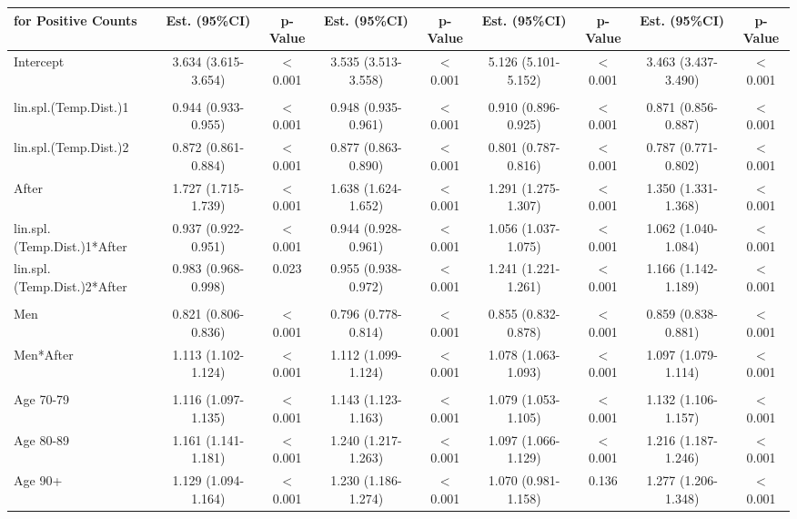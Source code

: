 \begin{landscape}
\begin{table}[H]
\begin{tabular}{lcccccccc}
    \textbf{for Positive Counts} & \textbf{Est. (95\%CI)} & \textbf{p-Value} & \textbf{Est. (95\%CI)} & \textbf{p-Value} & \textbf{Est. (95\%CI)} & \textbf{p-Value} & \textbf{Est. (95\%CI)} & \textbf{p-Value} \\
    \midrule
    Intercept & 3.634 (3.615-3.654) & $<$0.001 & 3.535 (3.513-3.558) & $<$0.001 & 5.126 (5.101-5.152) & $<$0.001 & 3.463 (3.437-3.490) & $<$0.001 \\
          &       &       &       &       &       &       &       &  \\
    lin.spl.(Temp.Dist.)1 & 0.944 (0.933-0.955) & $<$0.001 & 0.948 (0.935-0.961) & $<$0.001 & 0.910 (0.896-0.925) & $<$0.001 & 0.871 (0.856-0.887) & $<$0.001 \\
    lin.spl.(Temp.Dist.)2 & 0.872 (0.861-0.884) & $<$0.001 & 0.877 (0.863-0.890) & $<$0.001 & 0.801 (0.787-0.816) & $<$0.001 & 0.787 (0.771-0.802) & $<$0.001 \\
    After & 1.727 (1.715-1.739) & $<$0.001 & 1.638 (1.624-1.652) & $<$0.001 & 1.291 (1.275-1.307) & $<$0.001 & 1.350 (1.331-1.368) & $<$0.001 \\
    lin.spl.(Temp.Dist.)1*After  & 0.937 (0.922-0.951) & $<$0.001 & 0.944 (0.928-0.961) & $<$0.001 & 1.056 (1.037-1.075) & $<$0.001 & 1.062 (1.040-1.084) &$<$0.001 \\
    lin.spl.(Temp.Dist.)2*After  & 0.983 (0.968-0.998) & 0.023 & 0.955 (0.938-0.972) & $<$0.001 & 1.241 (1.221-1.261) & $<$0.001 & 1.166 (1.142-1.189) & $<$0.001 \\
          &       &       &       &       &       &       &       &  \\
    Men   & 0.821 (0.806-0.836) & $<$0.001 & 0.796 (0.778-0.814) & $<$0.001 & 0.855 (0.832-0.878) & $<$0.001 & 0.859 (0.838-0.881) & $<$0.001 \\
    Men*After & 1.113 (1.102-1.124) & $<$0.001 & 1.112 (1.099-1.124) & $<$0.001 & 1.078 (1.063-1.093) & $<$0.001 & 1.097 (1.079-1.114) & $<$0.001 \\
          &       &       &       &       &       &       &       &  \\
    Age 70-79 & 1.116 (1.097-1.135) & $<$0.001 & 1.143 (1.123-1.163) & $<$0.001 & 1.079 (1.053-1.105) & $<$0.001 & 1.132 (1.106-1.157) & $<$0.001 \\
    Age 80-89 & 1.161 (1.141-1.181) & $<$0.001 & 1.240 (1.217-1.263) & $<$0.001 & 1.097 (1.066-1.129) & $<$0.001 & 1.216 (1.187-1.246) & $<$0.001 \\
    Age 90+ & 1.129 (1.094-1.164) & $<$0.001 & 1.230 (1.186-1.274) & $<$0.001 & 1.070 (0.981-1.158) & 0.136 & 1.277 (1.206-1.348) & $<$0.001 \\

\end{tabular}
\end{table}
\end{landscape}
